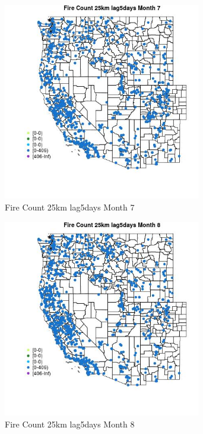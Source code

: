 \begin{figure} 
\centering  
\includegraphics[width=0.77\textwidth]{Code_Outputs/Report_ML_input_PM25_Step4_part_f_de_duplicated_aveswNAs_MapObsMo7Fire_Count_25km_lag5days.jpg} 
\caption{\label{fig:Report_ML_input_PM25_Step4_part_f_de_duplicated_aveswNAsMapObsMo7Fire_Count_25km_lag5days}Fire Count 25km lag5days Month 7} 
\end{figure} 
 

\clearpage 

\begin{figure} 
\centering  
\includegraphics[width=0.77\textwidth]{Code_Outputs/Report_ML_input_PM25_Step4_part_f_de_duplicated_aveswNAs_MapObsMo8Fire_Count_25km_lag5days.jpg} 
\caption{\label{fig:Report_ML_input_PM25_Step4_part_f_de_duplicated_aveswNAsMapObsMo8Fire_Count_25km_lag5days}Fire Count 25km lag5days Month 8} 
\end{figure} 
 

